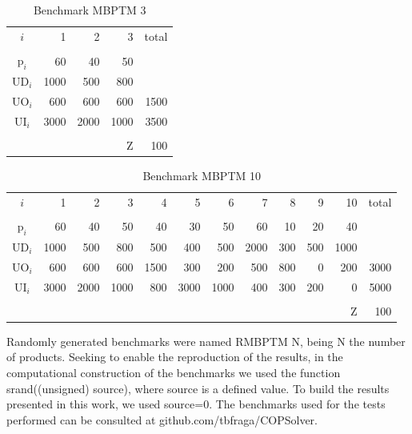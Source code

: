 \documentclass[authoryear,manuscript,12pt]{elsarticle}
\begin{document}
\begin{table}[h]
\begin{center}
\begin{tabular}[c]{c r r r r}
$i$ & 1 & 2 & 3 & total \\
\cline {1-5} \\
$\textrm{p}_i$ & 60 & 40 & 50 \\
$\textrm{UD}_i$ & 1000 & 500 & 800 \\
$\textrm{UO}_i$ & 600 & 600 & 600 & 1500 \\
$\textrm{UI}_i$ & 3000 & 2000 & 1000 & 3500 \\
\cline {1-5} \\
& & & $\textrm{Z}$ & 100 \\
\end{tabular}
\caption{Benchmark MBPTM 3}
\label{tab:MBPTMP002}
\end{center}
\end{table}

\begin{table}[h]
\begin{center}
\begin{small}
\begin{tabular}[c]{c r r r r r r r r r r r }
$i$ & 1 & 2 & 3 & 4 & 5 & 6 & 7 & 8 & 9 & 10 & total \\
\cline {1-12} \\
$\textrm{p}_i$ & 60 & 40 & 50 & 40 & 30 & 50 & 60 & 10 & 20 & 40\\
$\textrm{UD}_i$ & 1000 & 500 & 800 & 500 & 400 & 500 & 2000 & 300 & 500 & 1000 \\
$\textrm{UO}_i$ & 600 & 600 & 600 & 1500 & 300 & 200 & 500 & 800 & 0 & 200 & 3000 \\
$\textrm{UI}_i$ & 3000 & 2000 & 1000 & 800 & 3000 & 1000 & 400 & 300 & 200 & 0 & 5000 \\
\cline {1-12} \\
& & & & & & & & & & $\textrm{Z}$ & 100 \\
\end{tabular}
\caption{Benchmark MBPTM 10}
\label{tab:MBPTMP003}
\end{small}
\end{center}
\end{table}

Randomly generated benchmarks were named RMBPTM $\textrm{N}$, being $\textrm{N}$ the number of products. Seeking to enable the reproduction of the results, in the computational construction of the benchmarks we used the function srand((unsigned) source), where source is a defined value. To build the results presented in this work, we used source=0. The benchmarks used for the tests performed can be consulted at github.com/tbfraga/COPSolver.
\end{document}
